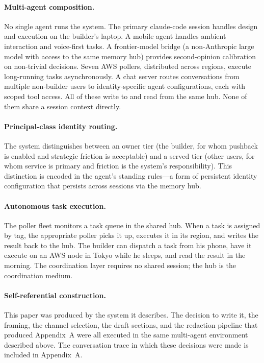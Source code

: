 \documentclass{article}
\begin{document}
\paragraph{Multi-agent composition.}
No single agent runs the system. The primary claude-code session handles design and execution on the builder's laptop. A mobile agent handles ambient interaction and voice-first tasks. A frontier-model bridge (a non-Anthropic large model with access to the same memory hub) provides second-opinion calibration on non-trivial decisions. Seven AWS pollers, distributed across regions, execute long-running tasks asynchronously. A chat server routes conversations from multiple non-builder users to identity-specific agent configurations, each with scoped tool access. All of these write to and read from the same hub. None of them share a session context directly.

\paragraph{Principal-class identity routing.}
The system distinguishes between an owner tier (the builder, for whom pushback is enabled and strategic friction is acceptable) and a served tier (other users, for whom service is primary and friction is the system's responsibility). This distinction is encoded in the agent's standing rules---a form of persistent identity configuration that persists across sessions via the memory hub.

\paragraph{Autonomous task execution.}
The poller fleet monitors a task queue in the shared hub. When a task is assigned by tag, the appropriate poller picks it up, executes it in its region, and writes the result back to the hub. The builder can dispatch a task from his phone, have it execute on an AWS node in Tokyo while he sleeps, and read the result in the morning. The coordination layer requires no shared session; the hub is the coordination medium.

\paragraph{Self-referential construction.}
This paper was produced by the system it describes. The decision to write it, the framing, the channel selection, the draft sections, and the redaction pipeline that produced Appendix~A were all executed in the same multi-agent environment described above. The conversation trace in which these decisions were made is included in Appendix~A.
\end{document}

